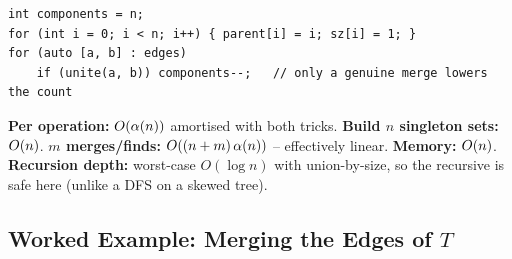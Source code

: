 \begin{lstlisting}[caption={component counting: start at n, decrement on every real merge}, label={lst:c28-comp}]
int components = n;
for (int i = 0; i < n; i++) { parent[i] = i; sz[i] = 1; }
for (auto [a, b] : edges)
    if (unite(a, b)) components--;   // only a genuine merge lowers the count
\end{lstlisting}

\begin{complexitybox}
\textbf{Per operation:} \(O(\alpha(n))\) amortised with both tricks.
\textbf{Build \(n\) singleton sets:} \(O(n)\).  \textbf{\(m\) merges/finds:}
\(O((n+m)\,\alpha(n))\) -- effectively linear.  \textbf{Memory:} \(O(n)\).
\textbf{Recursion depth:} worst-case \(O(\log n)\) with union-by-size, so the
recursive  is safe here (unlike a DFS on a skewed tree).
\end{complexitybox}

\subsection{Worked Example: Merging the Edges of \(T\)}

